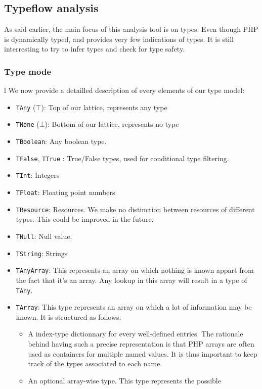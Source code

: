 \documentclass[a4paper]{article}
\begin{document}
\subsection{Typeflow analysis}
As said earlier, the main focus of this analysis tool is on types. Even though
PHP is dynamically typed, and provides very few indications of types. It is
still interresting to try to infer types and check for type safety.

\subsubsection{Type mode}l
We now provide a detailled description of every elements of our type model:
\begin{itemize}
  \item \verb=TAny= ($\top$): Top of our lattice, represents any type
  \item \verb=TNone= ($\bot$): Bottom of our lattice, represents no type
  \item \verb=TBoolean=: Any boolean type.
  \item \verb=TFalse=, \verb=TTrue= : True/False types, used for conditional
    type filtering.
  \item \verb=TInt=: Integers
  \item \verb=TFloat=: Floating point numbers
  \item \verb=TResource=: Resources. We make no distinction between resources
    of different types. This could be improved in the future.
  \item \verb=TNull=: Null value.
  \item \verb=TString=: Strings
  \item \verb=TAnyArray=: This represents an array on which nothing is known
    appart from the fact that it's an array. Any lookup in this array will
    result in a type of \verb=TAny=.
  \item \verb=TArray=: This type represents an array on which a lot of information
    may be known. It is structured as follows:
    \begin{itemize}
        \item A index-type dictionnary for every well-defined entries. The rationale
          behind having such a precise representation is that PHP arrays are often
          used as containers for multiple named values. It is thus important to keep
          track of the types associated to each name.
        \item An optional array-wise type. This type represents the possible 

\end{itemize}
\end{itemize}
\end{document}
